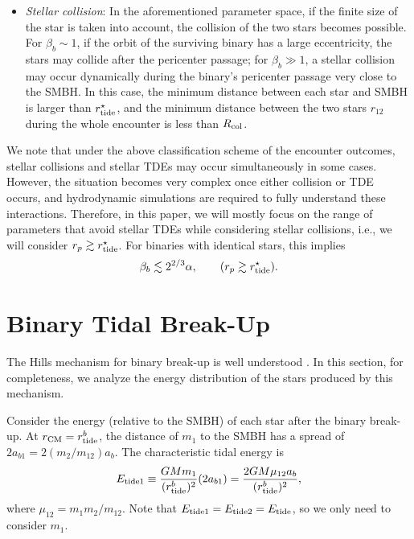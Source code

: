 \documentclass[twocolumn]{aastex631}
\begin{document}
\begin{itemize}
    \item {\it Stellar collision}: 
    In the aforementioned parameter space, if the finite size of the star is taken into account, the collision of the two stars becomes possible. 
    For $\beta_b \sim 1$, if the orbit of the surviving binary has a large eccentricity, the stars may collide after the pericenter passage; 
    for $\beta_b \gg 1$, a stellar collision may occur dynamically during the binary's pericenter passage very close to the SMBH.
    In this case, the minimum distance between each star and SMBH is larger than $r_{\rm tide}^\star$,
    and the minimum distance between the two stars $r_{12}$ during the whole encounter is less than $R_{\rm col}$.
\end{itemize}

We note that under the above classification scheme of the encounter outcomes, stellar collisions and stellar TDEs may occur simultaneously in some cases. 
However, the situation becomes very complex once either collision or TDE occurs, 
and hydrodynamic simulations are required to fully understand these interactions. 
Therefore, in this paper, we will mostly focus on the range of parameters that avoid stellar TDEs while considering stellar collisions, i.e., we will consider $r_p\gtrsim r_{\rm tide}^\star$.
For binaries with identical stars, this implies 
\begin{equation}
    \beta_b \lesssim 2^{2/3} \alpha, \qquad (r_p \gtrsim r_{\rm tide}^\star).
\label{eq:avoidTDE}
\end{equation}


\section{Binary Tidal Break-Up}
\label{sec:binary tidal break-up}

The Hills mechanism for binary break-up is well understood \citep{Hills1988Nature}. 
In this section, for completeness, we analyze the energy distribution of the stars produced by this mechanism.

Consider the energy (relative to the SMBH) of each star after the binary break-up.
At $r_{\rm CM}=r_{\rm tide}^b$, the distance of $m_1$ to the SMBH has a spread of $2a_{b1}=2(m_2/m_{12})a_b$.
The characteristic tidal energy is
\begin{equation} 
E_{\rm tide1} \equiv \frac{GM m_1}{({r_{\rm tide}^{b}})^2} (2a_{b1})=\frac{2GM \mu_{12}a_b}{({r_{\rm tide}^{b}})^2},
\label{eq:Etide}
\end{equation}
where $\mu_{12}=m_1m_2/m_{12}$. Note that $E_{\rm tide1}=E_{\rm tide2}=E_{\rm tide}$, so we only need to consider $m_1$.
\end{document}
